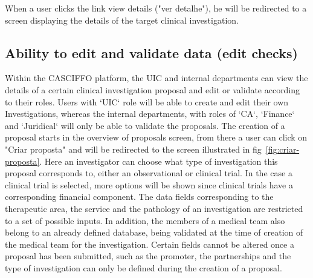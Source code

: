 When a user clicks the link view details ("ver detalhe"), he will be redirected to a screen displaying the details of the target clinical investigation.

\subsection{Ability to edit and validate data (edit checks)}
Within the CASCIFFO platform, the UIC and internal departments can view the details of a certain clinical investigation proposal and edit or validate according to their roles.
Users with `UIC` role will be able to create and edit their own Investigations, whereas the internal departments, with roles of `CA`, `Finance` and `Juridical` will only be able to validate the proposals.  
The creation of a proposal starts in the overview of proposals screen, from there a user can click on "Criar proposta" and will be redirected to the screen illustrated in fig~\ref{fig:criar-proposta}. Here an investigator can choose what type of investigation this proposal corresponds to, either an observational or clinical trial. In the case a clinical trial is selected, more options will be shown since clinical trials have a corresponding financial component.
The data fields corresponding to the therapeutic area, the service and the pathology of an investigation are restricted to a set of possible inputs. In addition, the members of a medical team also belong to an already defined database, being validated at the time of creation of the medical team for the investigation.  
Certain fields cannot be altered once a proposal has been submitted, such as the promoter, the partnerships and the type of investigation can only be defined during the creation of a proposal.  


